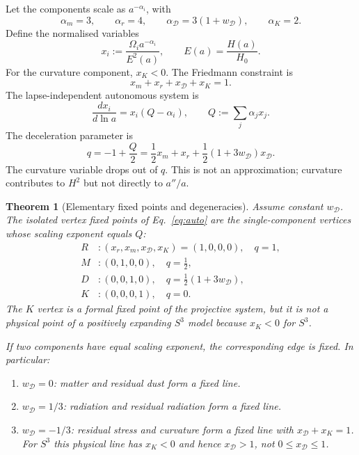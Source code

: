 \documentclass[
  aps,
  prd,
  reprint,
  superscriptaddress,
  nofootinbib,
  floatfix,
  longbibliography
]{revtex4-2}
\newtheorem{theorem}{Theorem}
\newcommand{\D}{\mathcal D}
\begin{document}
Let the components scale as \(a^{-\alpha_i}\), with
\[
  \alpha_m=3,\qquad \alpha_r=4,\qquad
  \alpha_\D=3(1+w_\D),\qquad \alpha_K=2 .
\]
Define the normalised variables
\begin{equation}
  x_i:=\frac{\Omega_i a^{-\alpha_i}}{E^2(a)},\qquad
  E(a)=\frac{H(a)}{H_0}.
\end{equation}
For the curvature component, \(x_K<0\).  The Friedmann constraint is
\begin{equation}
  x_m+x_r+x_\D+x_K=1.
  \label{eq:xconstraint}
\end{equation}
The lapse-independent autonomous system is
\begin{equation}
  \frac{dx_i}{d\ln a}=x_i(Q-\alpha_i),
  \qquad
  Q:=\sum_j\alpha_j x_j .
  \label{eq:auto}
\end{equation}
The deceleration parameter is
\begin{equation}
  q=-1+\frac{Q}{2}
   =\frac12 x_m+x_r+\frac12(1+3w_\D)x_\D .
  \label{eq:q}
\end{equation}
The curvature variable drops out of \(q\).  This is not an approximation; curvature
contributes to \(H^2\) but not directly to \(a''/a\).

\begin{theorem}[Elementary fixed points and degeneracies]
\label{thm:fixed}
Assume constant \(w_\D\).  The isolated vertex fixed points of
Eq.~\eqref{eq:auto} are the single-component vertices whose scaling exponent
equals \(Q\):
\begin{align}
  R &: (x_r,x_m,x_\D,x_K)=(1,0,0,0),\quad q=1,\\
  M &: (0,1,0,0),\quad q=\frac12,\\
  D &: (0,0,1,0),\quad q=\frac12(1+3w_\D),\\
  K &: (0,0,0,1),\quad q=0 .
\end{align}
The \(K\) vertex is a formal fixed point of the projective system, but it is not a
physical point of a positively expanding \(S^3\) model because \(x_K<0\) for
\(S^3\).

If two components have equal scaling exponent, the corresponding edge is fixed.
In particular:
\begin{enumerate}
\item \(w_\D=0\): matter and residual dust form a fixed line.
\item \(w_\D=1/3\): radiation and residual radiation form a fixed line.
\item \(w_\D=-1/3\): residual stress and curvature form a fixed line with
      \(x_\D+x_K=1\).  For \(S^3\) this physical line has
      \(x_K<0\) and hence \(x_\D>1\), not \(0\le x_\D\le 1\).
\end{enumerate}
\end{theorem}
\end{document}
